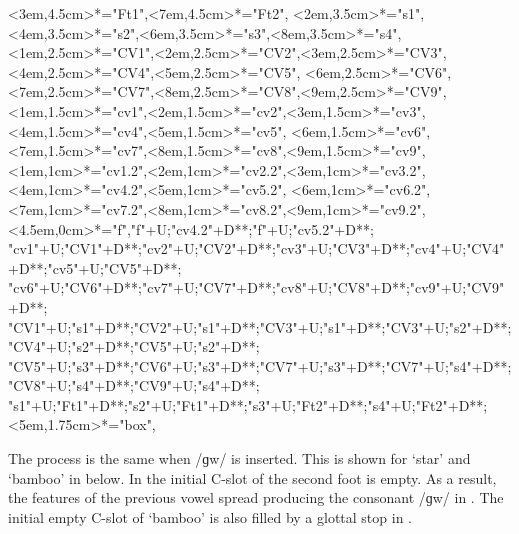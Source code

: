 \begin{multicols}{2}
\begin{exe}
{\begin{xlist}
{		<3em,4.5cm>*="Ft1",<7em,4.5cm>*="Ft2",
		<2em,3.5cm>*="s1",<4em,3.5cm>*="s2",<6em,3.5cm>*="s3",<8em,3.5cm>*="s4",
		<1em,2.5cm>*="CV1",<2em,2.5cm>*="CV2",<3em,2.5cm>*="CV3",<4em,2.5cm>*="CV4",<5em,2.5cm>*="CV5",
		<6em,2.5cm>*="CV6",<7em,2.5cm>*="CV7",<8em,2.5cm>*="CV8",<9em,2.5cm>*="CV9",
		<1em,1.5cm>*="cv1",<2em,1.5cm>*="cv2",<3em,1.5cm>*\as{ }="cv3",<4em,1.5cm>*="cv4",<5em,1.5cm>*\as{\j}="cv5",
		<6em,1.5cm>*="cv6",<7em,1.5cm>*\as{ }="cv7",<8em,1.5cm>*="cv8",<9em,1.5cm>*\as{ }="cv9",
		<1em,1cm>*="cv1.2",<2em,1cm>*="cv2.2",<3em,1cm>*\as{ }="cv3.2",<4em,1cm>*="cv4.2",<5em,1cm>*\as{\j}="cv5.2",
		<6em,1cm>*="cv6.2",<7em,1cm>*\as{ }="cv7.2",<8em,1cm>*="cv8.2",<9em,1cm>*\as{ }="cv9.2",
		<4.5em,0cm>*\as{\tsc{[+fr.]}}="f","f"+U;"cv4.2"+D**\dir{-};"f"+U;"cv5.2"+D**\dir{-};
		"cv1"+U;"CV1"+D**\dir{-};"cv2"+U;"CV2"+D**\dir{-};"cv3"+U;"CV3"+D**\dir{};"cv4"+U;"CV4"+D**\dir{-};"cv5"+U;"CV5"+D**\dir{-};
		"cv6"+U;"CV6"+D**\dir{-};"cv7"+U;"CV7"+D**\dir{};"cv8"+U;"CV8"+D**\dir{-};"cv9"+U;"CV9"+D**\dir{};
		"CV1"+U;"s1"+D**\dir{-};"CV2"+U;"s1"+D**\dir{-};"CV3"+U;"s1"+D**\dir{-};"CV3"+U;"s2"+D**\dir{-};"CV4"+U;"s2"+D**\dir{-};"CV5"+U;"s2"+D**\dir{-};
		"CV5"+U;"s3"+D**\dir{-};"CV6"+U;"s3"+D**\dir{-};"CV7"+U;"s3"+D**\dir{-};"CV7"+U;"s4"+D**\dir{-};"CV8"+U;"s4"+D**\dir{-};"CV9"+U;"s4"+D**\dir{-};
		"s1"+U;"Ft1"+D**\dir{-};"s2"+U;"Ft1"+D**\dir{-};"s3"+U;"Ft2"+D**\dir{-};"s4"+U;"Ft2"+D**\dir{-};
		<5em,1.75cm>*="box",
	\endxy}\label{as:niij=ee2}
	\end{xlist}}
\end{exe}
\end{multicols}

The process is the same when /ɡw/ is inserted.
This is shown for  {\ra} \mbox{} `star'
and  {\ra}  `bamboo' in  below.
In  the initial C-slot of the second foot is empty.
As a result, the features  of the previous vowel spread
producing the consonant /ɡw/ in .
The initial empty C-slot of  `bamboo'
is also filled by a glottal stop in .

